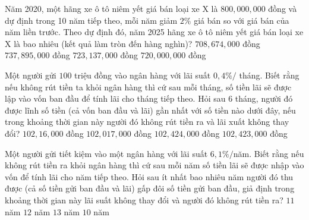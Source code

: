 \begin{ex}%
    [Mã 103 - 2020 Lần 2]%
    Năm 2020, một hãng xe ô tô niêm yết giá bán loại xe X là $800{,}000{,}000$ đồng và dự định trong 10 năm tiếp theo, mỗi năm giảm $2\%$ giá bán so với giá bán của năm liền trước. Theo dự định đó, năm 2025 hãng xe ô tô niêm yết giá bán loại xe X là bao nhiêu (kết quả làm tròn đến hàng nghìn)?
    \choice
    {$708{,}674{,}000$ đồng}
    {$737{,}895{,}000$ đồng}
    {\True $723{,}137{,}000$ đồng}
    {$720{,}000{,}000$ đồng}
\end{ex}
\begin{ex}%
    [Đề Tham Khảo 2018]%
    Một người gửi $100$ triệu đồng vào ngân hàng với lãi suất $0,4\%/$ tháng. Biết rằng nếu không rút tiền ta khỏi ngân hàng thì cứ sau mỗi tháng, số tiền lãi sẽ được lập vào vốn ban đầu để tính lãi cho tháng tiếp theo. Hỏi sau $6$ tháng, người đó được lĩnh số tiền (cả vốn ban đầu và lãi) gần nhất với số tiền nào dưới đây, nếu trong khoảng thời gian này người đó không rút tiền ra và lãi xuất không thay đổi?
    \choice
    {$102{,}16{,}000$ đồng}
    {$102{,}017{,}000$ đồng}
    {\True $102{,}424{,}000$ đồng}
    {$102{,}423{,}000$ đồng}
\end{ex}
\begin{ex}%
    [Mã 104 2018]%
    Một người gửi tiết kiệm vào một ngân hàng với lãi suất $ 6{,}1\%/$năm. Biết rằng nếu không rút tiền ra khỏi ngân hàng thì cứ sau mỗi năm số tiền lãi sẽ được nhập vào vốn để tính lãi cho năm tiếp theo. Hỏi sau ít nhất bao nhiêu năm người đó thu được (cả số tiền gửi ban đầu và lãi) gấp đôi số tiền gửi ban đầu, giả định trong khoảng thời gian này lãi suất không thay đổi và người đó không rút tiền ra?
    \choice
    {$ 11$ năm}
    {\True $ 12$ năm}
    {$ 13$ năm}
    {$ 10$ năm}
\end{ex}

